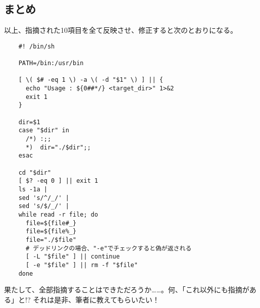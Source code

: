 \subsection*{まとめ}

以上、指摘された10項目を全て反映させ、修正すると次のとおりになる。

\noindent
\begin{frameboxit}{160.0mm}
\begin{verbatim}
	#! /bin/sh

	PATH=/bin:/usr/bin

	[ \( $# -eq 1 \) -a \( -d "$1" \) ] || {
	  echo "Usage : ${0##*/} <target_dir>" 1>&2
	  exit 1
	}

	dir=$1
	case "$dir" in
	  /*) :;;
	  *)  dir="./$dir";;
	esac

	cd "$dir"
	[ $? -eq 0 ] || exit 1
	ls -1a |
	sed 's/^/_/' |
	sed 's/$/_/' |
	while read -r file; do
	  file=${file#_}
	  file=${file%_}
	  file="./$file"
	  # デッドリンクの場合、"-e"でチェックすると偽が返される
	  [ -L "$file" ] || continue
	  [ -e "$file" ] || rm -f "$file"
	done
\end{verbatim}
\end{frameboxit}

果たして、全部指摘することはできただろうか……。何、「これ以外にも指摘がある」と!? それは是非、筆者に教えてもらいたい！